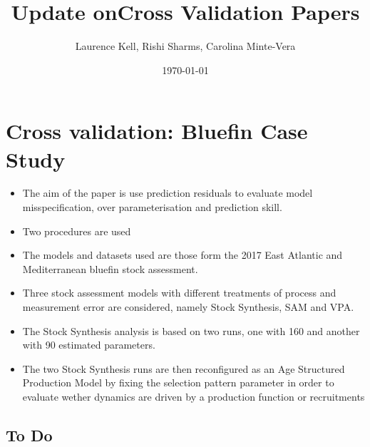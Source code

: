 \documentclass[a4paper,10pt]{article}
\title{Update onCross Validation Papers}
\author{Laurence Kell, Rishi Sharms, Carolina Minte-Vera}
\date{\today	}
\begin{document}
\maketitle

\newpage
\section*{Cross validation: Bluefin Case Study}

\begin{itemize}
 \item The aim of the paper is use prediction residuals to evaluate model misspecification, over parameterisation and prediction skill.
 \item Two procedures are used
 \item The models and datasets used are those form the 2017 East Atlantic and Mediterranean bluefin stock assessment. 
 \item Three stock assessment models with different treatments of process and measurement error are considered, namely Stock Synthesis, SAM and VPA.
 \item The Stock Synthesis analysis is based on two runs, one with 160 and another with 90 estimated parameters.   
 \item The two Stock Synthesis runs are then reconfigured as an Age Structured Production Model by fixing the selection pattern parameter in order to evaluate wether dynamics are driven by a production function or recruitments
\end{itemize}

\newpage
\subsection*{To Do}
\end{document}
